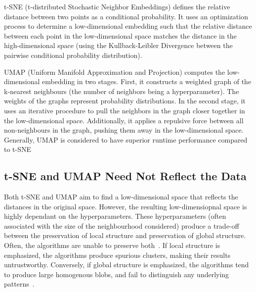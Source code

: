 
t-SNE (t-distributed Stochastic Neighbor Embeddings) defines the relative distance between two points as a conditional probability. It uses an optimization process to determine a low-dimensional embedding such that the relative distance between each point in the low-dimensional space matches the distance in the high-dimensional space (using the Kullback-Leibler Divergence between the pairwise conditional probability distribution).

UMAP (Uniform Manifold Approximation and Projection) computes the low-dimensional embedding in two stages. First, it constructs a weighted graph of the k-nearest neighbours (the number of neighbors being a hyperparameter). The weights of the graphs represent probability distributions. In the second stage, it uses an iterative procedure to pull the neighbors in the graph closer together in the low-dimensional space. Additionally, it applies a repulsive force between all non-neighbours in the graph, pushing them away in the low-dimensional space. Generally, UMAP is considered to have superior runtime performance compared to t-SNE~\cite{mcinnes2020umap}

\subsection*{t-SNE and UMAP Need Not Reflect the Data}

Both t-SNE and UMAP aim to find a low-dimensional space that reflects the distances in the original space. However, the resulting low-dimensiopnal space is highly dependant on the hyperparameters. These hyperparameters (often associated with the size of the neighbourhood considered) produce a trade-off between the preservation of local structure and preservation of global structure. Often, the algorithms are unable to preserve both~\cite{pacmap}. If local structure is emphasized, the algorithms produce spurious clusters, making their results untrustworthy. Conversely, if global structure is emphasized, the algorithms tend to produce large homogenous blobs, and fail to distinguish any underlying patterns~\cite{leiQuantifyingImpactUninformative2023}.


